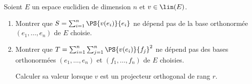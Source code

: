 \begin{enonce}
\begin{exercise}[ID={RMS126 E867},subtitle={CCP MP 2015},tags={}]
Soient $E$ un espace euclidien de dimension $n$ et $v\in\lin(E)$.
\begin{enumerate}
  \item Montrer que $S=\sum_{i=1}^n \PS{v(e_i)}{e_i}$ ne dépend pas de la base orthonormée $(e_1,\dots,e_n)$ de $E$ choisie.

  \item Montrer que $T=\sum_{i=1}^n \sum_{j=1}^n \PS{v(e_i)}{f_j}^2$ ne dépend pas des bases orthonormées  $(e_1,\dots,e_n)$ et $(f_1,\dots,f_n)$ de $E$ choisies.

    Calculer sa valeur lorsque $v$ est un projecteur orthogonal de rang $r$.
\end{enumerate}
\end{exercise}
\begin{solution}
\end{solution}
\end{enonce}

